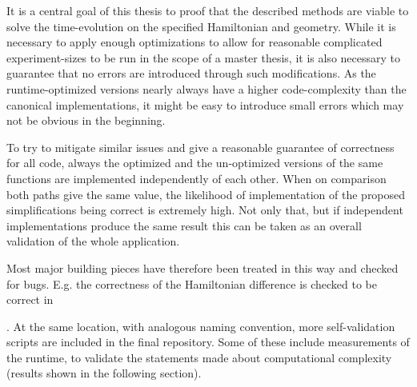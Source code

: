 It is a central goal of this thesis to proof that the described methods are viable to solve the time-evolution on the specified Hamiltonian and geometry.
While it is necessary to apply enough optimizations to allow for reasonable complicated experiment-sizes to be run in the scope of a master thesis, it is also necessary to guarantee that no errors are introduced through such modifications.
As the runtime-optimized versions nearly always have a higher code-complexity than the canonical implementations, it might be easy to introduce small errors which may not be obvious in the beginning.

To try to mitigate similar issues and give a reasonable guarantee of correctness for all code, always the optimized and the un-optimized versions of the same functions are implemented independently of each other.
When on comparison both paths give the same value, the likelihood of implementation of the proposed simplifications being correct is extremely high.
Not only that, but if independent implementations produce the same result this can be taken as an overall validation of the whole application.

Most major building pieces have therefore been treated in this way and checked for bugs.
E.g. the correctness of the Hamiltonian difference is checked to be correct in 

.
At the same location, with analogous naming convention, more self-validation scripts are included in the final repository.
Some of these include measurements of the runtime, to validate the statements made about computational complexity (results shown in the following section).
